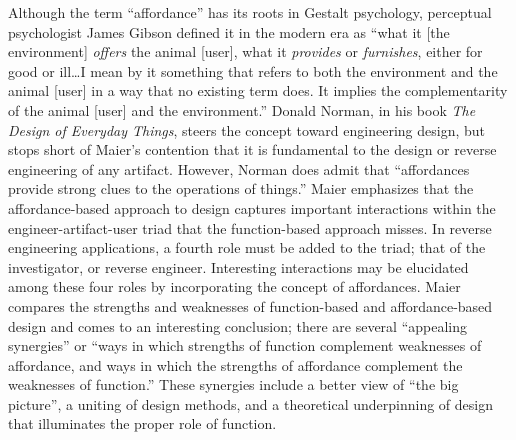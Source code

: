 Although the term “affordance” has its roots in Gestalt
psychology\citep{koffka1935}, perceptual psychologist James Gibson
defined it in the modern era as “what it [the environment]
\textit{offers} the animal [user], what it \textit{provides} or
\textit{furnishes}, either for good or ill{\ldots}I mean by it something that
refers to both the environment and the animal [user] in a way that no
existing term does. It implies the complementarity of the animal [user]
and the environment.”\citep[][pg. 127]{gibson1979} Donald Norman, in his book
\textit{The Design of Everyday Things}\citep{norman1988}, steers the
concept toward engineering design, but stops short of Maier’s
contention that it is fundamental to the design or reverse engineering
of any artifact. However, Norman does admit that “affordances provide
strong clues to the operations of things.” Maier emphasizes that the
affordance-based approach to design captures important interactions
within the engineer-artifact-user triad that the function-based
approach misses. In reverse engineering applications, a fourth role
must be added to the triad; that of the investigator, or reverse
engineer. Interesting interactions may be elucidated among these four
roles by incorporating the concept of affordances. Maier compares the
strengths and weaknesses of function-based and affordance-based design
and comes to an interesting conclusion; there are several “appealing
synergies” or “ways in which strengths of function complement
weaknesses of affordance, and ways in which the strengths of affordance
complement the weaknesses of function.”\citep{maierfadel2002} These
synergies include a better view of “the big picture”, a uniting of
design methods, and a theoretical underpinning of design that
illuminates the proper role of function.

